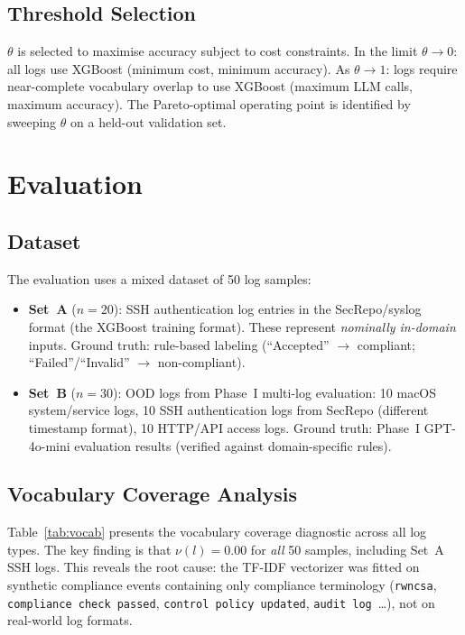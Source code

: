 \documentclass[11pt,conference]{IEEEtran}
\begin{document}
\subsection{Threshold Selection}

$\theta$ is selected to maximise accuracy subject to cost constraints.
In the limit $\theta \to 0$: all logs use XGBoost (minimum cost, minimum
accuracy). As $\theta \to 1$: logs require near-complete vocabulary overlap
to use XGBoost (maximum LLM calls, maximum accuracy). The Pareto-optimal
operating point is identified by sweeping $\theta$ on a held-out validation
set.

\section{Evaluation}

\subsection{Dataset}

The evaluation uses a mixed dataset of 50 log samples:

\begin{itemize}
    \item \textbf{Set~A} ($n=20$): SSH authentication log entries in the
    SecRepo/syslog format (the XGBoost training format). These represent
    \emph{nominally in-domain} inputs. Ground truth: rule-based labeling
    (``Accepted'' $\rightarrow$ compliant; ``Failed''/``Invalid'' $\rightarrow$
    non-compliant).
    \item \textbf{Set~B} ($n=30$): OOD logs from Phase~I multi-log
    evaluation: 10 macOS system/service logs, 10 SSH authentication logs
    from SecRepo (different timestamp format), 10 HTTP/API access logs.
    Ground truth: Phase~I GPT-4o-mini evaluation results (verified against
    domain-specific rules).
\end{itemize}

\subsection{Vocabulary Coverage Analysis}

Table~\ref{tab:vocab} presents the vocabulary coverage diagnostic across all
log types. The key finding is that $\nu(l) = 0.00$ for \emph{all} 50 samples,
including Set~A SSH logs. This reveals the root cause: the TF-IDF vectorizer
was fitted on synthetic compliance events containing only compliance
terminology (\texttt{rwncsa}, \texttt{compliance check passed},
\texttt{control policy updated}, \texttt{audit log}~\ldots), not on
real-world log formats.
\end{document}
